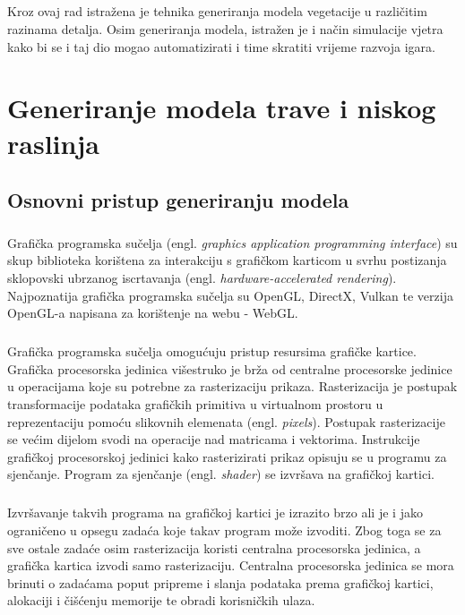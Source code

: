 \documentclass[times, utf8, diplomski]{fer}
\begin{document}
\paragraph{}
Kroz ovaj rad istražena je tehnika generiranja modela vegetacije u različitim razinama 
detalja. Osim generiranja modela, istražen je i način simulacije vjetra kako bi se i taj dio 
mogao automatizirati i time skratiti vrijeme razvoja igara.


\chapter{Generiranje modela trave i niskog raslinja}
\section{Osnovni pristup generiranju modela} \label{generation_basics}
\paragraph{}
Grafička programska sučelja (engl. \textit{graphics application programming interface}) su 
skup biblioteka korištena za interakciju s grafičkom karticom u svrhu postizanja
sklopovski ubrzanog iscrtavanja (engl. \textit{hardware-accelerated rendering}). Najpoznatija grafička programska sučelja su OpenGL, DirectX, Vulkan te verzija OpenGL-a 
napisana za korištenje na webu - WebGL.

\paragraph{}
Grafička programska sučelja omogućuju pristup resursima grafičke kartice. Grafička 
procesorska jedinica višestruko je brža od centralne procesorske jedinice u operacijama 
koje su potrebne za rasterizaciju prikaza. Rasterizacija je postupak transformacije 
podataka grafičkih primitiva u virtualnom prostoru u reprezentaciju pomoću slikovnih 
elemenata (engl. \textit{pixels}). Postupak rasterizacije se većim dijelom svodi na 
operacije nad matricama i vektorima. Instrukcije grafičkoj procesorskoj jedinici kako 
rasterizirati prikaz opisuju se u programu za sjenčanje. Program za sjenčanje (engl. 
\textit{shader}) se izvršava na grafičkoj kartici.

\paragraph{}
Izvršavanje takvih programa na grafičkoj kartici je izrazito brzo ali je i jako ograničeno 
u opsegu zadaća koje takav program može izvoditi. Zbog toga se za sve ostale zadaće osim 
rasterizacija koristi centralna procesorska jedinica, a grafička kartica izvodi samo 
rasterizaciju. Centralna procesorska jedinica se mora brinuti o zadaćama poput pripreme i 
slanja podataka prema grafičkoj kartici, alokaciji i čišćenju memorije te obradi 
korisničkih ulaza.
\end{document}
